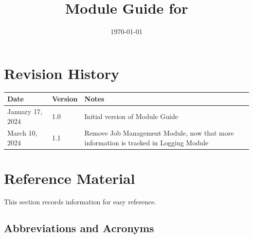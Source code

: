 \documentclass[12pt, titlepage]{article}
\begin{document}
\title{Module Guide for \progname{}}
\author{\authname}
\date{\today}

\maketitle


\section{Revision History}

\begin{tabularx}{\textwidth}{p{3cm}p{2cm}X}
  \toprule {\bf Date} & {\bf Version} & {\bf Notes} \\
  \midrule
  January 17, 2024 & 1.0 & Initial version of Module Guide \\
  March 10, 2024 & 1.1 & Remove Job Management Module, now that more information is tracked in Logging Module \\
  \bottomrule
\end{tabularx}

\newpage

\section{Reference Material}

This section records information for easy reference.

\subsection{Abbreviations and Acronyms}
\end{document}
